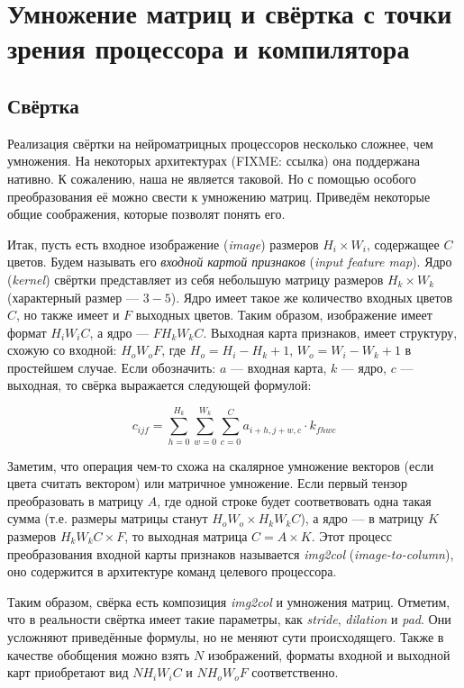 \section{Умножение матриц и свёртка с точки зрения процессора и компилятора}
\label{sec:Chapter3} 

\subsection{Свёртка}

Реализация свёртки на нейроматрицных процессоров несколько сложнее, чем умножения.
На некоторых архитектурах (FIXME: ссылка) она поддержана нативно. К сожалению, наша
не является таковой. Но с помощью особого преобразования её можно свести к 
умножению матриц. Приведём некоторые общие соображения, которые позволят понять его.

Итак, пусть есть входное изображение (\textit{image}) размеров $H_i \times W_i$,
содержащее $C$ цветов. Будем называть его \textit{входной картой признаков}
(\textit{input feature map}). Ядро (\textit{kernel}) свёртки представляет из
себя небольшую матрицу размеров $H_k \times W_k$ (характерный размер --- $3-5$).
Ядро имеет такое же количество входных цветов $C$, но также имеет и $F$
выходных цветов. Таким образом, изображение имеет формат $H_i W_i C$,
а ядро --- $F H_k W_k C$. Выходная карта признаков, имеет структуру, схожую
со входной: $H_o W_o F$, где $H_o = H_i - H_k + 1$, $W_o = W_i - W_k + 1$
в простейшем случае. Если обозначить: $a$ --- входная карта, $k$ --- ядро,
$c$ --- выходная, то свёрка выражается следующей формулой:

\[
    c_{ijf} = \sum \limits_{h = 0}^{H_k} \sum \limits_{w = 0}^{W_k}
              \sum \limits_{c = 0}^{C} a_{i+h, j+w, c} \cdot k_{f h w c}
\]

Заметим, что операция чем-то схожа на скалярное умножение векторов
(если цвета считать вектором) или матричное умножение. Если первый тензор
преобразовать в матрицу $A$, где одной строке будет соответвовать одна
такая сумма (т.е. размеры матрицы станут $H_o W_o \times H_k W_k C$), а
ядро --- в матрицу $K$ размеров $H_k W_k C \times F$, то выходная
матрица $C = A \times K$. Этот процесс преобразования входной карты
признаков называется \textit{img2col} (\textit{image-to-column}),
оно содержится в архитектуре команд целевого процессора.

Таким образом, свёрка есть композиция \textit{img2col} и умножения матриц.
Отметим, что в реальности свёртка имеет такие параметры, как
\textit{stride}, \textit{dilation} и \textit{pad}. Они усложняют
приведённые формулы, но не меняют сути происходящего. Также в
качестве обобщения можно взять $N$ изображений, форматы входной и
выходной карт приобретают вид $N H_i W_i C$ и $N H_o W_o F$ соответственно.

\newpage
